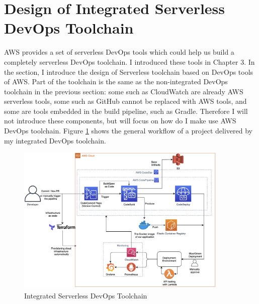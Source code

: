 \section{Design of Integrated Serverless DevOps Toolchain}
AWS provides a set of serverless DevOps tools which could help us build a completely serverless DevOps toolchain. I introduced these tools in Chapter 3. In the section, I introduce the design of Serverless toolchain based on DevOps tools of AWS. Part of the toolchain is the same as the non-integrated DevOps toolchain in the previous section: some such as CloudWatch are already AWS serverless tools, some such as GitHub cannot be replaced with AWS tools, and some are tools embedded in the build pipeline, such as Gradle. Therefore I will not introduce these components, but will focus on how do I make use AWS DevOps toolchain. Figure \ref{fig:codepipeline} shows the general workflow of a project delivered by my integrated DevOps toolchain.
\begin{figure}[h]
 \centering
 \includegraphics[width=0.90\textwidth]{pics/codepipeline.png}
 \caption{Integrated Serverless DevOps Toolchain}
 \label{fig:codepipeline}
\end{figure}
